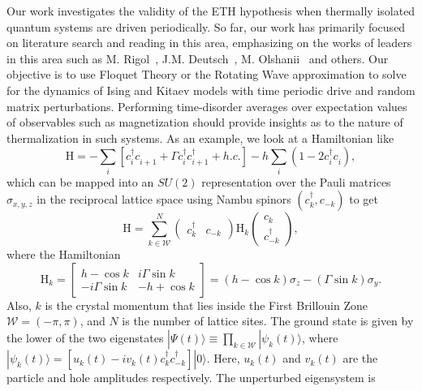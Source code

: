 \documentclass[a4paper,10pt]{report}
\begin{document}
Our work investigates the validity of the ETH hypothesis when thermally isolated quantum systems are driven periodically. So far, our work has primarily focused on literature search and reading in this area, emphasizing on the works of leaders in this area such as M. Rigol~\cite{rigol:nature}, J.M. Deutsch~\cite{deutsch}, M. Olshanii~\cite{olshanii:ipr} and others. Our objective is to use Floquet Theory or the Rotating Wave approximation to solve for the dynamics of Ising and Kitaev models with time periodic drive and random matrix perturbations. Performing time-disorder averages over expectation values of observables such as magnetization should provide insights as to the nature of thermalization in such systems. As an example, we look at a Hamiltonian like
\begin{equation}
\label{eq:hamiltonian}
\mathrm{H} = -\sum_i \left[c^\dagger_ic^{ }_{i+1} + \Gamma c^\dagger_ic^\dagger_{i+1}+h.c.\right]-h\sum_i\left(1-2c^\dagger_ic^{ }_i\right),
\end{equation}
which can be mapped into an $SU(2)$ representation over the Pauli matrices $\sigma_{x,y,z}$ in the reciprocal lattice space using Nambu spinors $( c^\dagger_k , c_{-k})$ to get
\begin{equation}
\label{eq:hamiltonian:su2}
\mathrm{H}=\sum^N_{k\in\mathcal{W}} \begin{pmatrix}
                   c^\dagger_k & c_{-k}
                  \end{pmatrix}
		 \mathrm{H}_k
		  \begin{pmatrix}
                           c_k \\
			   c^\dagger_{-k}
                          \end{pmatrix},
\end{equation}
where the Hamiltonian
\begin{equation}
\label{eq:hk}
\mathrm{H}_k =  \begin{bmatrix}
		  h-\cos{k} & i\Gamma \sin{k} \\
		  -i\Gamma \sin{k} & -h+\cos{k}
		  \end{bmatrix}=\left(h-\cos{k}\right)\sigma_z-\left(\Gamma\sin{k}\right)\sigma_y.
\end{equation}
Also, $k$ is the crystal momentum that lies inside the First Brillouin Zone $\mathcal{W}=(-\pi,\pi)$, and $N$ is the number of lattice sites. The ground state is given by the lower of the two eigenstates $|\Psi(t)\rangle\equiv\prod_{k\in\mathcal{W}}|\psi_k(t)\rangle$, where $|\psi_{k}(t)\rangle = \left[u_{k}(t)-iv_{k}(t)c^\dagger_kc^\dagger_{-k}\right]|0\rangle$. Here, $u_k(t)$ and $v_k(t)$ are the particle and hole amplitudes respectively. The unperturbed eigensystem is 
\end{document}

